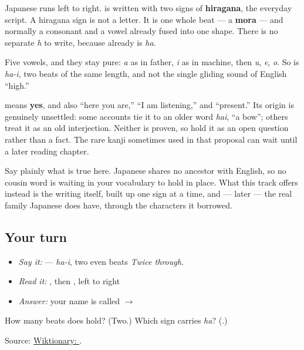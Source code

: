 Japanese runs left to right. \textbf{} is written with two signs of \textbf{hiragana}, the everyday script. A hiragana sign is not a letter. It is one whole beat — a \textbf{mora} — and normally a consonant and a vowel already fused into one shape. There is no separate \emph{h} to write, because \textbf{} already is \emph{ha}.

Five vowels, and they stay pure: \emph{a} as in father, \emph{i} as in machine, then \emph{u}, \emph{e}, \emph{o}. So \textbf{} is \emph{ha-i}, two beats of the same length, and not the single gliding sound of English \textquotedblleft{}high.\textquotedblright{}

\begin{cousinweb}
\textbf{} means \textbf{yes}, and also \textquotedblleft{}here you are,\textquotedblright{} \textquotedblleft{}I am listening,\textquotedblright{} and \textquotedblleft{}present.\textquotedblright{} Its origin is genuinely unsettled: some accounts tie it to an older word \emph{hai}, \textquotedblleft{}a bow\textquotedblright{}; others treat it as an old interjection. Neither is proven, so hold it as an open question rather than a fact. The rare kanji sometimes used in that proposal can wait until a later reading chapter.

Say plainly what is true here. Japanese shares no ancestor with English, so no cousin word is waiting in your vocabulary to hold \textbf{} in place. What this track offers instead is the writing itself, built up one sign at a time, and — later — the real family Japanese does have, through the characters it borrowed.
\end{cousinweb}

\subsection*{Your turn}
\begin{itemize}
\raggedright
  \item \emph{Say it:} \textbf{} — \emph{ha-i}, two even beats \emph{Twice through.}
  \item \emph{Read it:} \textbf{}, then \textbf{}, left to right
  \item \emph{Answer:} your name is called $\to$ \textbf{}
\end{itemize}

\begin{tcolorbox}[breakable,colback=teal!4,colframe=teal!35!black,title={Before you move on}]
How many beats does \textbf{} hold? (Two.) Which sign carries \emph{ha}? (\textbf{}.)

Source: \href{https://en.wiktionary.org/wiki/\%E3\%81\%AF\%E3\%81\%84}{Wiktionary: }.
\end{tcolorbox}
